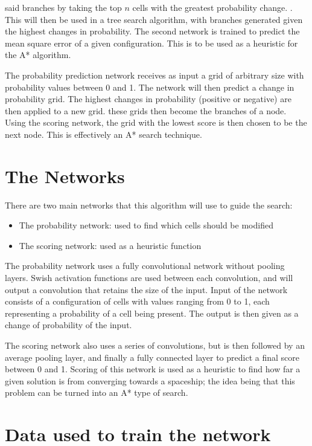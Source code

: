 \documentclass{l4proj}
\begin{document}
said branches by taking the top $n$ cells with the greatest probability change. 
. This will then be used in a tree search algorithm, with branches generated given the highest changes in probability. The second network is trained to predict the mean square error of a given configuration. This is to be used as a heuristic for the A* algorithm.

The probability prediction network receives as input a grid of arbitrary size with probability values between 0 and 1. The network will then predict a change in probability grid. The highest changes in probability (positive or negative) are then applied to a new grid. these grids then become the branches of a node. Using the scoring network, the grid with the lowest score is then chosen to be the next node. This is effectively an A* search technique.

\section{The Networks}

There are two main networks that this algorithm will use to guide the search:

\begin{itemize}
    \item The probability network: used to find which cells should be modified
    \item The scoring network: used as a heuristic function
\end{itemize}

The probability network uses a fully convolutional network without pooling layers. Swish activation functions are used between each convolution, and will output a convolution that retains the size of the input. Input of the network consists of a configuration of cells with values ranging from 0 to 1, each representing a probability of a cell being present. The output is then given as a change of probability of the input.

The scoring network also uses a series of convolutions, but is then followed by an average pooling layer, and finally a fully connected layer to predict a final score between 0 and 1. Scoring of this network is used as a heuristic to find how far a given solution is from converging towards a spaceship; the idea being that this problem can be turned into an A* type of search.

\section{Data used to train the network}
\end{document}
